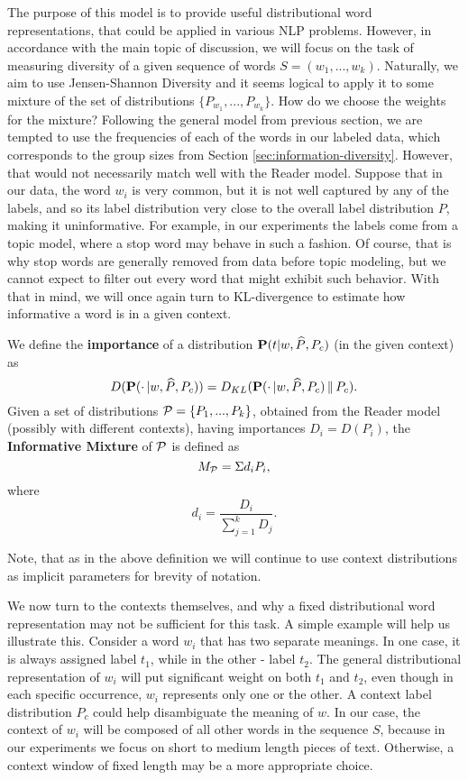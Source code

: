 The purpose of this model is to provide useful distributional
word representations, that could be applied in various NLP
problems. However, in accordance with the main topic of discussion, we will
focus on the task of measuring diversity of a given sequence of words
$S=(w_1,...,w_k)$. Naturally, we aim to use Jensen-Shannon Diversity
and it seems logical to apply it to some mixture of the set of
distributions $\{P_{w_1},...,P_{w_k}\}$. How do we choose the weights
for the mixture? Following the general model from previous section, we
are tempted to use the frequencies of each of the words in our labeled data,
which corresponds to the group sizes from Section
\ref{sec:information-diversity}. However, that would not 
necessarily match well with the Reader model. Suppose that in our
data, the word $w_i$ is very common, but it is not well captured by any of
the labels, and so its label distribution very close to the overall
label distribution $P$, making it uninformative. For example, in our
experiments the labels come from a topic model, where a stop word may
behave in such a fashion. Of course, that is why stop words are
generally removed from data before topic modeling, but we cannot
expect to filter out every word that might exhibit such behavior. With
that in mind, we will once again turn to KL-divergence to
estimate how informative a word is in a given context.

\bed
We define the {\bf importance} of a distribution $\operatorname{\mathbf{P}}(t|w,\widehat{P},P_c)$ (in 
the given context) as
\[D(\operatorname{\mathbf{P}}(\cdot\,|w,\widehat{P},P_c)) =
D_{KL}(\operatorname{\mathbf{P}}(\cdot\,|w,\widehat{P},P_c)\,\|\,P_c).\]
Given a set of distributions ${\mathcal P} = \{P_1,...,P_k\}$, obtained from the
Reader model (possibly with different contexts), having importances
$D_i=D(P_i)$, the {\bf Informative Mixture} of ${\mathcal P}$ is defined as
\[M_{{\mathcal P}} = \Sigma d_i P_i,\]
where
\[d_i = \frac{D_i}{\sum_{j=1}^k D_j}.\]
\eed

Note, that as in the above definition we will continue to use context
distributions as implicit parameters for brevity of notation.

We now turn to the contexts themselves, and why a fixed distributional
word representation may not be sufficient for this task. A simple example will
help us illustrate this. Consider a word $w_i$ that has
two separate meanings. In one case, it is always assigned label $t_1$,
while in the other - label $t_2$. The general distributional
representation of $w_i$ will put significant weight on both $t_1$ and
$t_2$, even though in each specific occurrence, $w_i$ represents only one
or the other. A context label distribution $P_c$ could help disambiguate
the meaning of $w$. In our case, the context of $w_i$ will be composed of
all other words in the sequence $S$, because in our experiments we
focus on short to medium length pieces of text. Otherwise, a context
window of fixed length may be a more appropriate choice.

